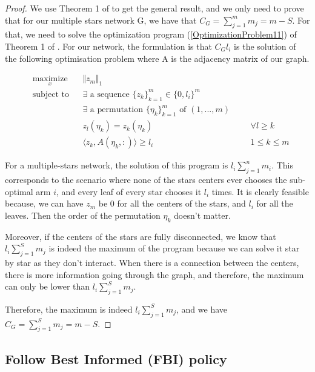 \documentclass{article}
\begin{document}
\begin{proof}

We use Theorem 1 of \cite{DBLP:journals/corr/KollaJG16} to get the general result, and we only need to prove that for our multiple stars network G, we have that $C_G = \sum_{j=1}^m m_j = m - S$. For that, we need to solve the optimization program (\ref{OptimizationProblem11}) of Theorem 1 of \cite{DBLP:journals/corr/KollaJG16}. For our network, the formulation is that $C_Gl_i$ is the solution of the following optimisation problem where A is the adjacency matrix of our graph.

\begin{equation*}
\begin{aligned}
& \underset{x}{\text{maximize}}
&& \Vert z_m \Vert_1
&&& \\
& \text{subject to}
&& \exists\text{ a sequence }\{z_k\}_{k=1}^{m} \in \{0, l_i\}^{m}
&&& \\
&
&& \exists\text{ a permutation }\{\eta_k\}_{k=1}^{m} \text{ of } (1, ..., m)
&&& \\
&
&& z_l(\eta_k) = z_k(\eta_k)
&&& \forall l \geq k \\
&
&& \langle z_k, A(\eta_k, :)\rangle \geq l_i
&&& 1\leq k \leq m
\end{aligned}
\end{equation*}

For a multiple-stars network, the solution of this program is $l_i \sum_{j=1}^n m_i$. This corresponds to the scenario where none of the stars centers ever chooses the sub-optimal arm $i$, and every leaf of every star chooses it $l_i$ times. It is clearly feasible because, we can have $z_{m}$ be 0 for all the centers of the stars, and $l_i$ for all the leaves. Then the order of the permutation $\eta_k$ doesn't matter.

Moreover, if the centers of the stars are fully disconnected, we know that $l_i \sum_{j=1}^S m_j$ is indeed the maximum of the program because we can solve it star by star as they don't interact. When there is a connection between the centers, there is more information going through the graph, and therefore, the maximum can only be lower than $l_i \sum_{j=1}^S m_j$.

Therefore, the maximum is indeed $l_i \sum_{j=1}^S m_j$, and we have $C_G = \sum_{j=1}^S m_j = m - S$.

\end{proof}


\subsection{Follow Best Informed (FBI) policy}
\end{document}
